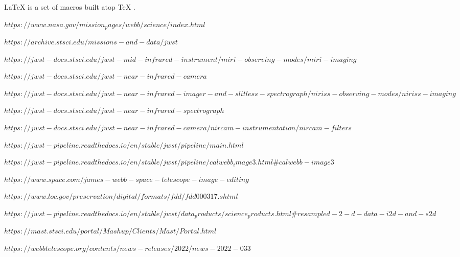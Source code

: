 \documentclass[10pt,twocolumn,letterpaper]{article}
\begin{document}


\LaTeX{} \cite{lamport94} is a set of macros built atop \TeX{} \cite{texbook}.
\begin{thebibliography}{9}
$https://www.nasa.gov/mission_pages/webb/science/index.html$

$https://archive.stsci.edu/missions-and-data/jwst$

$https://jwst-docs.stsci.edu/jwst-mid-infrared-instrument/miri-observing-modes/miri-imaging$

$https://jwst-docs.stsci.edu/jwst-near-infrared-camera$

$https://jwst-docs.stsci.edu/jwst-near-infrared-imager-and-slitless-spectrograph/niriss-observing-modes/niriss-imaging$

$https://jwst-docs.stsci.edu/jwst-near-infrared-spectrograph$

$https://jwst-docs.stsci.edu/jwst-near-infrared-camera/nircam-instrumentation/nircam-filters$

$https://jwst-pipeline.readthedocs.io/en/stable/jwst/pipeline/main.html$

$https://jwst-pipeline.readthedocs.io/en/stable/jwst/pipeline/calwebb_image3.html\#calwebb-image3$

$https://www.space.com/james-webb-space-telescope-image-editing$

$https://www.loc.gov/preservation/digital/formats/fdd/fdd000317.shtml$

$https://jwst-pipeline.readthedocs.io/en/stable/jwst/data_products/science_products.html\#resampled-2-d-data-i2d-and-s2d$

$https://mast.stsci.edu/portal/Mashup/Clients/Mast/Portal.html$

$https://webbtelescope.org/contents/news-releases/2022/news-2022-033$

\end{thebibliography}
\end{document}
